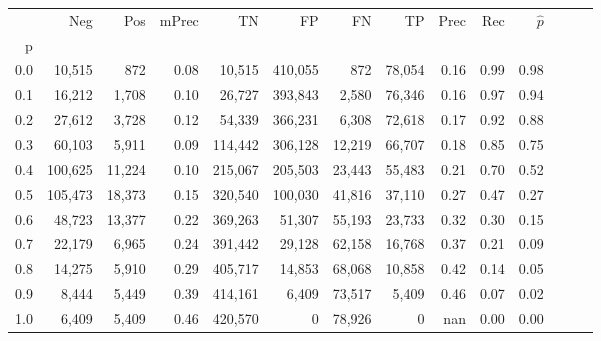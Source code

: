\begin{tabular}{rrrrrrrrrrrrrr}
\toprule
{} &      Neg &     Pos & mPrec &       TN &       FP &      FN &      TP &  Prec &   Rec & $\hat{p}$ \\
p   &          &         &       &          &          &         &         &       &       &           \\
\midrule
0.0 &   10,515 &     872 &  0.08 &   10,515 &  410,055 &     872 &  78,054 &  0.16 &  0.99 &      0.98 \\
0.1 &   16,212 &   1,708 &  0.10 &   26,727 &  393,843 &   2,580 &  76,346 &  0.16 &  0.97 &      0.94 \\
0.2 &   27,612 &   3,728 &  0.12 &   54,339 &  366,231 &   6,308 &  72,618 &  0.17 &  0.92 &      0.88 \\
0.3 &   60,103 &   5,911 &  0.09 &  114,442 &  306,128 &  12,219 &  66,707 &  0.18 &  0.85 &      0.75 \\
0.4 &  100,625 &  11,224 &  0.10 &  215,067 &  205,503 &  23,443 &  55,483 &  0.21 &  0.70 &      0.52 \\
0.5 &  105,473 &  18,373 &  0.15 &  320,540 &  100,030 &  41,816 &  37,110 &  0.27 &  0.47 &      0.27 \\
0.6 &   48,723 &  13,377 &  0.22 &  369,263 &   51,307 &  55,193 &  23,733 &  0.32 &  0.30 &      0.15 \\
0.7 &   22,179 &   6,965 &  0.24 &  391,442 &   29,128 &  62,158 &  16,768 &  0.37 &  0.21 &      0.09 \\
0.8 &   14,275 &   5,910 &  0.29 &  405,717 &   14,853 &  68,068 &  10,858 &  0.42 &  0.14 &      0.05 \\
0.9 &    8,444 &   5,449 &  0.39 &  414,161 &    6,409 &  73,517 &   5,409 &  0.46 &  0.07 &      0.02 \\
1.0 &    6,409 &   5,409 &  0.46 &  420,570 &        0 &  78,926 &       0 &   nan &  0.00 &      0.00 \\
\bottomrule
\end{tabular}
